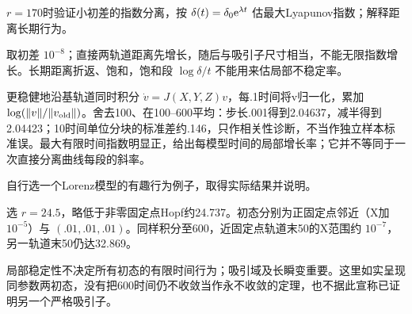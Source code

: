 \begin{exercise}\label{task:chaos-PS8-6}
$r=170$时验证小初差的指数分离，按 $\delta(t)=\delta_0\mathrm e^{\lambda t}$ 估最大Lyapunov指数；解释距离长期行为。
\end{exercise}
\begin{solution}
取初差 $10^{-8}$；直接两轨道距离先增长，随后与吸引子尺寸相当，不能无限指数增长。长期距离折返、饱和，饱和段 $\log\delta/t$ 不能用来估局部不稳定率。
\begin{center}\end{center}
更稳健地沿基轨道同时积分 $\dot v=J(X,Y,Z)v$，每.1时间将v归一化，累加 $\log(\|v\|/\|v_{\rm old}\|)$。舍去100、在100--600平均：步长.001得到2.04637，减半得到2.04423；10时间单位分块的标准差约.146，只作相关性诊断，不当作独立样本标准误。最大有限时间指数明显正，给出每模型时间的局部增长率；它并不等同于一次直接分离曲线每段的斜率。
\end{solution}
\begin{exercise}\label{task:chaos-PS8-7}
自行选一个Lorenz模型的有趣行为例子，取得实际结果并说明。
\end{exercise}
\begin{solution}
选 $r=24.5$，略低于非零固定点Hopf约24.737。初态分别为正固定点邻近（X加 $10^{-5}$）与 $(.01,.01,.01)$。同样积分至600，近固定点轨道末50的X范围约 $10^{-7}$，另一轨道末50仍达32.869。
\begin{center}\end{center}
局部稳定性不决定所有初态的有限时间行为；吸引域及长瞬变重要。这里如实呈现同参数两初态，没有把600时间仍不收敛当作永不收敛的定理，也不据此宣称已证明另一个严格吸引子。
\end{solution}

